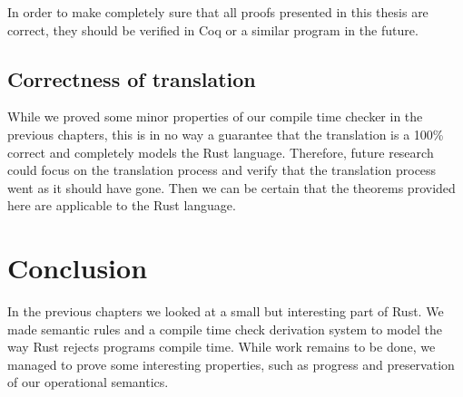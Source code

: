 In order to make completely sure that all proofs presented in this thesis are correct, they should be verified in Coq or a similar program in the future. 

\subsection{Correctness of translation}
While we proved some minor properties of our compile time checker in the previous chapters, this is in no way a guarantee that the translation is a 100\% correct and completely models the Rust language. Therefore, future research could focus on the translation process and verify that the translation process went as it should have gone. Then we can be certain that the theorems provided here are applicable to the Rust language. 

\section{Conclusion}
In the previous chapters we looked at a small but interesting part of Rust. We made semantic rules and a compile time check derivation system to model the way Rust rejects programs compile time. While work remains to be done, we managed to prove some interesting properties, such as progress and preservation of our operational semantics.
